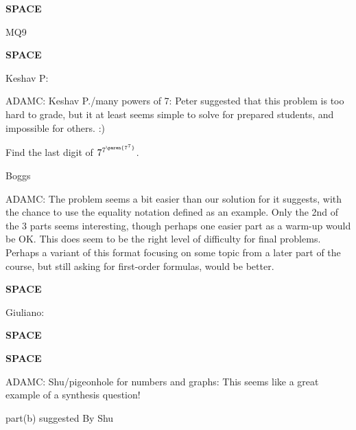 \documentclass[quiz]{mcs}
\renewcommand{\examspace}{\textbf{SPACE}\newline}
\begin{document}

\examspace
\begin{editingnotes}MQ9\end{editingnotes}

\examspace
\begin{editingnotes}Keshav P:\end{editingnotes}

\begin{editingnotes}
ADAMC: Keshav P./many powers of 7: Peter suggested that this problem is too
hard to grade, but it at least seems simple to solve for prepared
students, and impossible for others. :)
\end{editingnotes}

Find the last digit of $7^{7^{\paren{7^7}}}$.


\begin{editingnotes}Boggs

ADAMC: The problem seems a bit easier than our solution for it
suggests, with the chance to use the equality notation defined as an
example.  Only the 2nd of the 3 parts seems interesting, though
perhaps one easier part as a warm-up would be OK.  This does seem to
be the right level of difficulty for final problems.  Perhaps a
variant of this format focusing on some topic from a later part of the
course, but still asking for first-order formulas, would be better.
\end{editingnotes}


\examspace
\begin{editingnotes}Giuliano:\end{editingnotes}


\examspace


\iffalse
\examspace
\begin{editingnotes}
ADAMC: Shu Zheng: sums of kth powers: This looks like a reasonable
problem that only involves number theory.

Question 1 - Number Theory (from question 4 of Fall 2006 pset 3
\end{editingnotes}

\pinput{CP_Sk_equiv_-1_mod_p}
\fi

\examspace
\begin{editingnotes}
ADAMC: Shu/pigeonhole for numbers and graphs: This seems like a great
example of a synthesis question!

part(b) suggested By Shu
\end{editingnotes}
\end{document}
